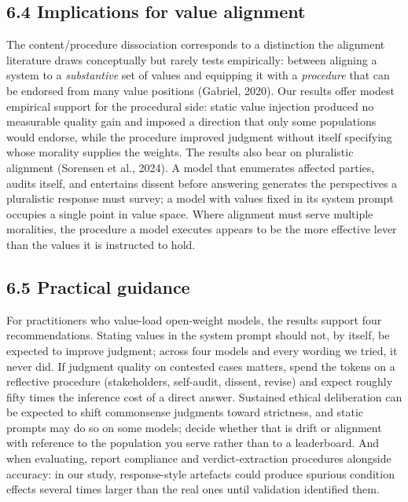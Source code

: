 \documentclass[
  11pt,
]{article}
\begin{document}
\subsection{6.4 Implications for value
alignment}\label{implications-for-value-alignment}

The content/procedure dissociation corresponds to a distinction the
alignment literature draws conceptually but rarely tests empirically:
between aligning a system to a \emph{substantive} set of values and
equipping it with a \emph{procedure} that can be endorsed from many
value positions (Gabriel, 2020). Our results offer modest empirical
support for the procedural side: static value injection produced no
measurable quality gain and imposed a direction that only some
populations would endorse, while the procedure improved judgment without
itself specifying whose morality supplies the weights. The results also
bear on pluralistic alignment (Sorensen et al., 2024). A model that
enumerates affected parties, audits itself, and entertains dissent
before answering generates the perspectives a pluralistic response must
survey; a model with values fixed in its system prompt occupies a single
point in value space. Where alignment must serve multiple moralities,
the procedure a model executes appears to be the more effective lever
than the values it is instructed to hold.

\subsection{6.5 Practical guidance}\label{practical-guidance}

For practitioners who value-load open-weight models, the results support
four recommendations. Stating values in the system prompt should not, by
itself, be expected to improve judgment; across four models and every
wording we tried, it never did. If judgment quality on contested cases
matters, spend the tokens on a reflective procedure (stakeholders,
self-audit, dissent, revise) and expect roughly fifty times the
inference cost of a direct answer. Sustained ethical deliberation can be
expected to shift commonsense judgments toward strictness, and static
prompts may do so on some models; decide whether that is drift or
alignment with reference to the population you serve rather than to a
leaderboard. And when evaluating, report compliance and
verdict-extraction procedures alongside accuracy: in our study,
response-style artefacts could produce spurious condition effects
several times larger than the real ones until validation identified
them.
\end{document}
